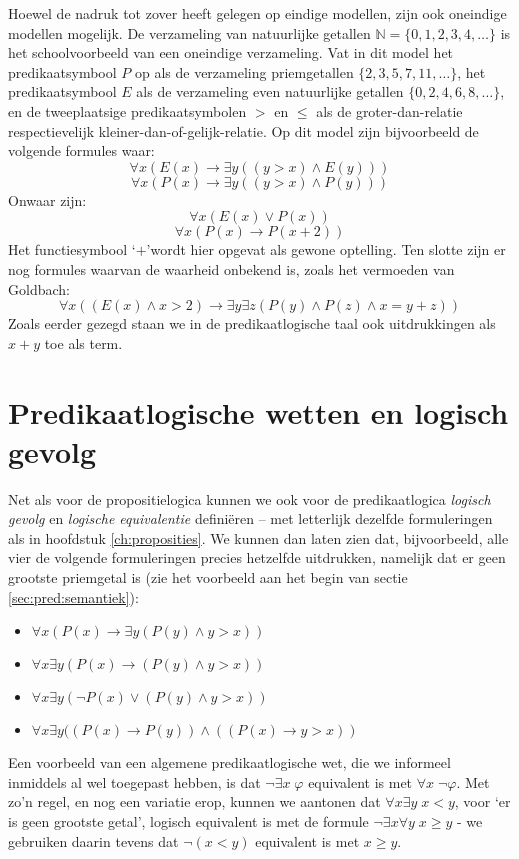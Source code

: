 \begin{example}
Hoewel de nadruk tot zover heeft gelegen op eindige modellen, zijn ook oneindige modellen mogelijk. De verzameling van natuurlijke getallen $\mathbb{N}=\{0, 1, 2, 3, 4, \ldots\}$ is het schoolvoorbeeld van een oneindige verzameling. Vat in dit model het predikaatsymbool $P$ op als de verzameling priemgetallen $\{2,3,5,7,11,\ldots\}$, het predikaatsymbool $E$ als de verzameling even natuurlijke getallen $\{0,2,4,6,8,\ldots\}$, en de tweeplaatsige predikaatsymbolen $>$ en $\leq$ als de groter-dan-relatie respectievelijk kleiner-dan-of-gelijk-relatie. Op dit model zijn bijvoorbeeld de volgende formules waar:
$$\forall x(E(x)\rightarrow\exists y((y>x)\wedge E(y)))$$
$$\forall x(P(x)\rightarrow\exists y((y>x)\wedge P(y)))$$
Onwaar zijn:
$$\forall x(E(x)\vee P(x))$$
$$\forall x(P(x)\rightarrow P(x+2))$$
Het functiesymbool `$+$'wordt hier opgevat als gewone optelling. Ten slotte zijn er nog formules waarvan de waarheid onbekend is, zoals het vermoeden van Goldbach:
$$\forall x((E(x)\wedge x>2)\rightarrow\exists y\exists z(P(y)\wedge P(z)\wedge x=y+z))$$
Zoals eerder gezegd staan we in de predikaatlogische taal ook uitdrukkingen als $x+y$ toe als term.
\end{example}

\section{Predikaatlogische wetten en logisch gevolg}
 Net als voor de propositielogica kunnen we ook voor de predikaatlogica \textit{logisch gevolg} en \textit{logische equivalentie} defini\"eren -- met letterlijk dezelfde formuleringen als in hoofdstuk \ref{ch:proposities}. We kunnen dan laten zien dat, bijvoorbeeld, alle vier de volgende formuleringen precies hetzelfde uitdrukken, namelijk dat er geen grootste priemgetal is (zie het voorbeeld aan het begin van sectie \ref{sec:pred:semantiek}):
 \begin{itemize}
     \item $\forall x(P(x)\rightarrow\exists y(P(y)\wedge y>x))$
     \item $\forall x\exists y(P(x)\rightarrow(P(y)\wedge y>x))$
     \item $\forall x\exists y(\neg P(x)\vee(P(y)\wedge y>x))$
     \item $\forall x\exists y((P(x)\rightarrow P(y))\wedge((P(x)\rightarrow y>x))$
 \end{itemize}
 Een voorbeeld van een algemene predikaatlogische wet, die we informeel inmiddels al wel toegepast hebben, is dat $\neg\exists x\;\varphi$ equivalent is met $\forall x\;\neg\varphi$. Met zo'n regel, en nog een variatie erop, kunnen we aantonen dat $\forall x\exists y\;x<y$, voor `er is geen grootste getal', logisch equivalent is met de formule $\neg\exists x\forall y\;x\geq y$ - we gebruiken daarin tevens dat $\neg(x<y)$ equivalent is met $x\geq y$.
 
